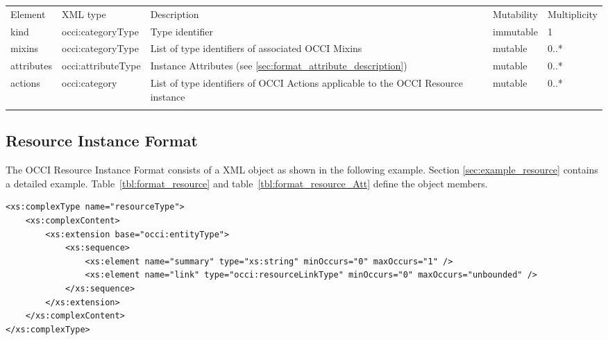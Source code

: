 \documentclass[10pt,a4paper]{article}
\begin{document}
 {
    \begin{tabularx}{\textwidth}{llXll}
    \toprule
    Element & XML type & Description & Mutability & Multiplicity \\
    \colrule
    kind & occi:categoryType & Type identifier & immutable & 1 \\

    mixins & occi:categoryType & List of type identifiers of associated OCCI Mixins & mutable & 0..* \\

    attributes & occi:attributeType & Instance Attributes (see
\ref{sec:format_attribute_description}) & mutable & 0..* \\
    
    actions & occi:category & List of type identifiers of OCCI
Actions applicable to the OCCI Resource instance & mutable & 0..* \\
    \botrule
    \end{tabularx}
}
\FloatBarrier

\subsection{Resource Instance Format}
\label{sec:format_resource}

The OCCI Resource Instance Format consists of a XML object as shown in the
following example. Section \ref{sec:example_resource} contains a detailed
example.
Table~\ref{tbl:format_resource} and table~\ref{tbl:format_resource_Att} define the object members.

\begin{lstlisting}
<xs:complexType name="resourceType">
	<xs:complexContent>
		<xs:extension base="occi:entityType">
			<xs:sequence>
				<xs:element name="summary" type="xs:string" minOccurs="0" maxOccurs="1" />
				<xs:element name="link" type="occi:resourceLinkType" minOccurs="0" maxOccurs="unbounded" />
			</xs:sequence>
		</xs:extension>
	</xs:complexContent>
</xs:complexType>
\end{lstlisting}
\end{document}
